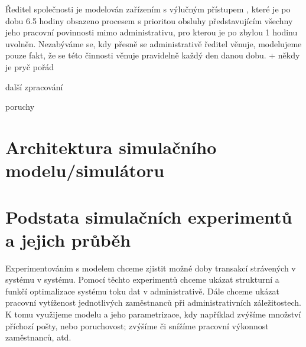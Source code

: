 \documentclass[12pt,a4paper]{article}
\begin{document}
Ředitel společnosti je modelován zařízením s výlučným přístupem \cite{ims-zarizeni}, které je po dobu 6.5 hodiny obsazeno procesem s prioritou obsluhy
představujícím všechny jeho pracovní povinnosti mimo administrativu, pro kterou je po zbylou 1 hodinu uvolněn.
Nezabýváme se, kdy přesně se administrativě ředitel věnuje, modelujeme pouze fakt, že se této činnosti věnuje pravidelně každý den danou dobu.
+ někdy je pryč pořád

další zpracování

poruchy




\newpage


\section{Architektura simulačního modelu/simulátoru}


\newpage


\section{Podstata simulačních experimentů a jejich průběh}

Experimentováním s modelem chceme zjistit možné doby transakcí strávených v systému v systému. Pomocí těchto experimentů chceme ukázat strukturní a funkčí optimalizace systému toku dat v administrativě. Dále chceme ukázat pracovní vytíženost jednotlivých zaměstnanců při administrativních záležitostech. K tomu využijeme modelu a jeho parametrizace, kdy například zvýšíme množství příchozí pošty, nebo poruchovost; zvýšíme či snížíme pracovní výkonnost zaměstnanců, atd.
\newpage
\end{document}
